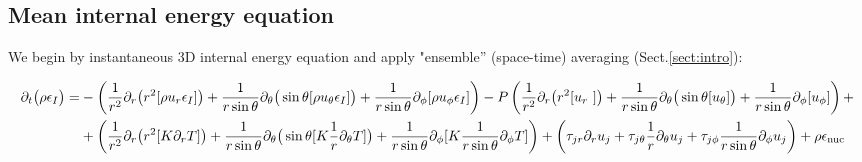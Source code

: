 \documentclass[10pt,paper=a4]{report}
\begin{document}
\fontsize{12pt}{20pt}

\subsection{Mean internal energy equation}
\label{sect:mean-internal-energy-eq}

We begin by instantaneous 3D internal energy equation and apply "ensemble'' (space-time) averaging (Sect.\ref{sect:intro}):

\fontsize{9pt}{20pt}

\begin{align}
\partial_{t} \big(\rho \epsilon_I\big)  = &  - \left( \frac{1}{r^{2}}\partial_{r}\big(r^{2}[\rho u_{r} \epsilon_I]\big) + \frac{1}{r\sin{\theta}}\partial_{\theta} \big(\sin{\theta} [\rho u_{\theta} \epsilon_I]\big) + \frac{1}{r\sin{\theta}}\partial_{\phi} [\rho u_{\phi} \epsilon_I] \right) - P \left( \frac{1}{r^{2}}\partial_{r}\big(r^{2}[u_{r}~]\big) + \frac{1}{r\sin{\theta}}\partial_{\theta} \big(\sin{\theta} [u_{\theta}]\big) + \frac{1}{r\sin{\theta}}\partial_{\phi} [u_{\phi}]  \right) + \nonumber \\
& + \left( \frac{1}{r^{2}}\partial_{r}\big(r^{2}[K\partial_r T]\big) + \frac{1}{r\sin{\theta}}\partial_{\theta} \big(\sin{\theta} [K\frac{1}{r}\partial_\theta T]\big) + \frac{1}{r\sin{\theta}}\partial_{\phi} [K\frac{1}{r\sin{\theta}}\partial_\phi T] \right) + \left( \tau_{jr} \partial_r u_j + \tau_{j\theta} \frac{1}{r}\partial_\theta u_j + \tau_{j\phi} \frac{1}{r\sin{\theta}}\partial_\phi u_j  \right) + \rho \epsilon_{\rm nuc} 
\end{align}
\end{document}
